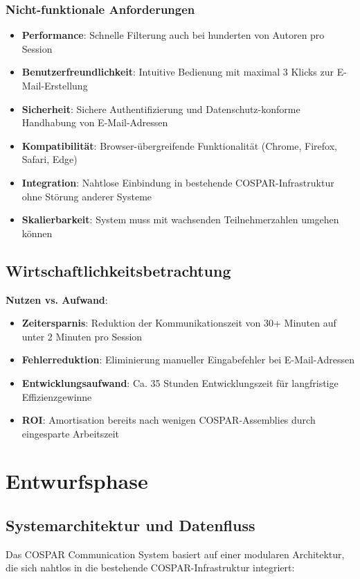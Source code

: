 \documentclass[11pt,a4paper]{article}
\begin{document}
\subsubsection{Nicht-funktionale Anforderungen}
\begin{itemize}
    \item \textbf{Performance}: Schnelle Filterung auch bei hunderten von Autoren pro Session
    \item \textbf{Benutzerfreundlichkeit}: Intuitive Bedienung mit maximal 3 Klicks zur E-Mail-Erstellung
    \item \textbf{Sicherheit}: Sichere Authentifizierung und Datenschutz-konforme Handhabung von E-Mail-Adressen
    \item \textbf{Kompatibilität}: Browser-übergreifende Funktionalität (Chrome, Firefox, Safari, Edge)
    \item \textbf{Integration}: Nahtlose Einbindung in bestehende COSPAR-Infrastruktur ohne Störung anderer Systeme
    \item \textbf{Skalierbarkeit}: System muss mit wachsenden Teilnehmerzahlen umgehen können
\end{itemize}

\subsection{Wirtschaftlichkeitsbetrachtung}
\textbf{Nutzen vs. Aufwand}:
\begin{itemize}
    \item \textbf{Zeitersparnis}: Reduktion der Kommunikationszeit von 30+ Minuten auf unter 2 Minuten pro Session
    \item \textbf{Fehlerreduktion}: Eliminierung manueller Eingabefehler bei E-Mail-Adressen
    \item \textbf{Entwicklungsaufwand}: Ca. 35 Stunden Entwicklungszeit für langfristige Effizienzgewinne
    \item \textbf{ROI}: Amortisation bereits nach wenigen COSPAR-Assemblies durch eingesparte Arbeitszeit
\end{itemize}

\newpage
\section{Entwurfsphase}

\subsection{Systemarchitektur und Datenfluss}
Das COSPAR Communication System basiert auf einer modularen Architektur, die sich nahtlos in die bestehende COSPAR-Infrastruktur integriert:
\end{document}
